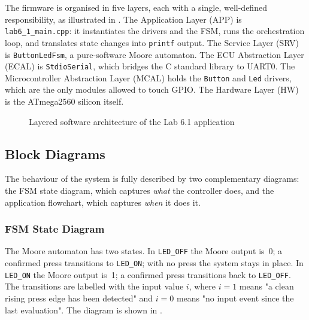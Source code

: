 The firmware is organised in five layers, each with a single, well-defined responsibility, as illustrated in . The Application Layer (APP) is \texttt{lab6\_1\_main.cpp}: it instantiates the drivers and the FSM, runs the orchestration loop, and translates state changes into \texttt{printf} output. The Service Layer (SRV) is \texttt{ButtonLedFsm}, a pure-software Moore automaton. The ECU Abstraction Layer (ECAL) is \texttt{StdioSerial}, which bridges the C standard library to UART0. The Microcontroller Abstraction Layer (MCAL) holds the \texttt{Button} and \texttt{Led} drivers, which are the only modules allowed to touch GPIO. The Hardware Layer (HW) is the ATmega2560 silicon itself.

\begin{figure}[H]
\centering
{}
\caption{Layered software architecture of the Lab 6.1 application}
\label{fig:layered_architecture}
\end{figure}

\subsection{Block Diagrams}

The behaviour of the system is fully described by two complementary diagrams: the FSM state diagram, which captures \emph{what} the controller does, and the application flowchart, which captures \emph{when} it does it.

\subsubsection{FSM State Diagram}

The Moore automaton has two states. In \texttt{LED\_OFF} the Moore output is~0; a confirmed press transitions to \texttt{LED\_ON}; with no press the system stays in place. In \texttt{LED\_ON} the Moore output is~1; a confirmed press transitions back to \texttt{LED\_OFF}. The transitions are labelled with the input value $i$, where $i = 1$ means "a clean rising press edge has been detected" and $i = 0$ means "no input event since the last evaluation". The diagram is shown in .

